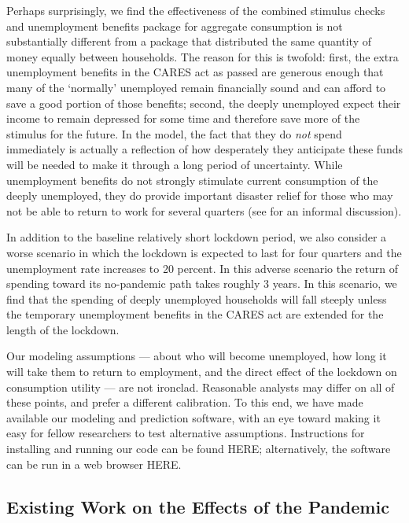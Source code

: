 Perhaps surprisingly, we find the effectiveness of the combined stimulus checks and unemployment benefits package for aggregate consumption is not substantially different from a package that distributed the same quantity of money equally between households.
The reason for this is twofold: first, the extra unemployment benefits in the CARES act as passed are generous enough that many of the `normally' unemployed remain financially sound and can afford to save a good portion of those benefits; second, the deeply unemployed expect their income to remain depressed for some time and therefore save more of the stimulus for the future.  In the model, the fact that they do \textit{not} spend immediately is actually a reflection of how desperately they anticipate these funds will be needed to make it through a long period of uncertainty.
While unemployment benefits do not strongly stimulate current consumption of the deeply unemployed, they do provide important disaster relief for those who may not be able to return to work for several quarters (see \cite{krugman_corona} for an informal discussion).

In addition to the baseline relatively short lockdown period, we also consider a worse scenario in which the lockdown is expected to last for four quarters and the unemployment rate increases to 20 percent. In this adverse scenario the return of spending toward its no-pandemic path takes roughly 3 years. In this scenario, we find that the spending of deeply unemployed households will fall steeply unless the temporary unemployment benefits in the CARES act are extended for the length of the lockdown.


Our modeling assumptions --- about who will become unemployed, how long it will take them to return to employment, and the direct effect of the lockdown on consumption utility --- are not ironclad.
Reasonable analysts may differ on all of these points, and prefer a different calibration.
To this end, we have made available our modeling and prediction software, with an eye toward making it easy for fellow researchers to test alternative assumptions.
Instructions for installing and running our code can be found HERE; alternatively, the software can be run in a web browser HERE.


\subsection*{Existing Work on the Effects of the Pandemic}

